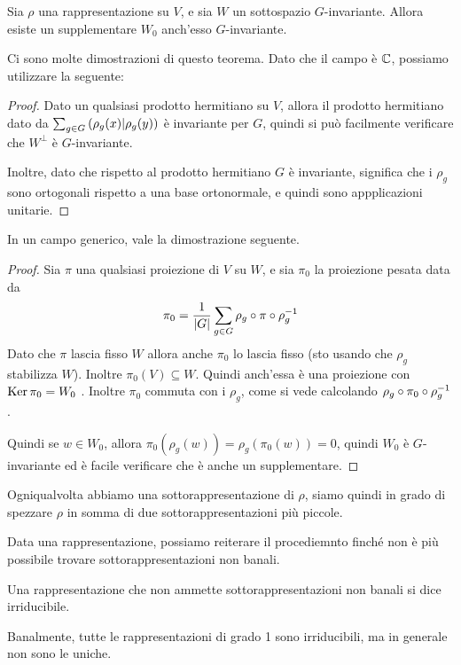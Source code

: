 	\begin{mytheorem}[Maschke]\label{Th:SupplInv}
		Sia $\rho$ una rappresentazione su $V$, e sia $W$ un sottospazio $G$-invariante. Allora esiste un supplementare $W_0$ anch'esso $G$-invariante.
	\end{mytheorem}
	
	Ci sono molte dimostrazioni di questo teorema. Dato che il campo è $\mathbb C$, possiamo utilizzare la seguente:
	\begin{proof}
		Dato un qualsiasi prodotto hermitiano su $V$, allora il prodotto hermitiano dato da $\sum_{g\in G}\left(\rho_g(x) | \rho_g(y)\right)$ è invariante per $G$, quindi si può facilmente verificare che $W^\perp$ è $G$-invariante.
		
		Inoltre, dato che rispetto al prodotto hermitiano $G$ è invariante, significa che i $\rho_g$ sono ortogonali rispetto a una base ortonormale, e quindi sono appplicazioni unitarie.
	\end{proof}

	In un campo generico, vale la dimostrazione seguente.
	\begin{proof}
		Sia $\pi$ una qualsiasi proiezione di $V$ su $W$, e sia $\pi_0$ la proiezione pesata data da
		\[
		\pi_0=\frac1{\left|G\right|} \sum_{g\in G} \rho_g \circ \pi \circ \rho_g^{-1}
		\]
		Dato che $\pi$ lascia fisso $W$ allora anche $\pi_0$ lo lascia fisso (sto usando che $\rho_g$ stabilizza $W$). Inoltre $\pi_0(V) \subseteq W$. Quindi anch'essa è una proiezione con $\operatorname{Ker} \pi_0=W_0$ . Inoltre $\pi_0$ commuta con i $\rho_g$, come si vede calcolando $\rho_g \circ \pi_0 \circ \rho_g^{-1}$.
		
		Quindi se $w\in W_0$, allora $\pi_0 (\rho_g(w))=\rho_g(\pi_0(w))=0$, quindi $W_0$ è $G$-invariante ed è facile verificare che è anche un supplementare.
	\end{proof}

	Ogniqualvolta abbiamo una sottorappresentazione di $\rho$, siamo quindi in grado di spezzare $\rho$ in somma di due sottorappresentazioni più piccole. 

	Data una rappresentazione, possiamo reiterare il procediemnto finché non è più possibile trovare sottorappresentazioni non banali.

	\begin{mydef}
		Una rappresentazione che non ammette sottorappresentazioni non banali si dice irriducibile.
	\end{mydef}

	Banalmente, tutte le rappresentazioni di grado 1 sono irriducibili, ma in generale non sono le uniche.

